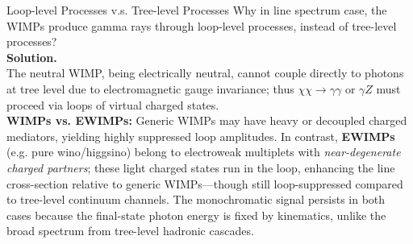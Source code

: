 \bigskip \noindent
\begin{example}{Loop-level Processes v.s. Tree-level Processes}{}
    Why in line spectrum case, the WIMPs produce gamma rays through loop-level processes, instead of tree-level processes? \\

    \bigskip\textbf{Solution.}\quad \\
    The neutral WIMP, being electrically neutral, cannot couple directly to photons at tree level due to electromagnetic gauge invariance; thus $\chi\chi\to\gamma\gamma$ or $\gamma Z$ must proceed via loops of virtual charged states.  \\

    \textbf{WIMPs vs. EWIMPs:} Generic WIMPs may have heavy or decoupled charged mediators, yielding highly suppressed loop amplitudes. In contrast, \textbf{EWIMPs} (e.g. pure wino/higgsino) belong to electroweak multiplets with \textit{near-degenerate charged partners}; these light charged states run in the loop, enhancing the line cross-section relative to generic WIMPs—though still loop-suppressed compared to tree-level continuum channels. The monochromatic signal persists in both cases because the final-state photon energy is fixed by kinematics, unlike the broad spectrum from tree-level hadronic cascades.
\end{example}

\clearpage

